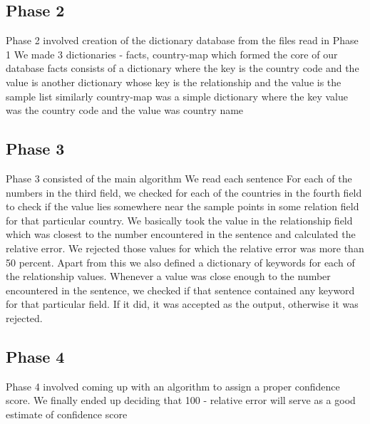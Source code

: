\documentclass{pracjourn}
\begin{document}
\subsection{Phase 2}
Phase 2 involved creation of the dictionary database from the files read in Phase 1
We made 3 dictionaries - facts, country-map which formed the core of our database
facts consists of a dictionary where the key is the country code and the value is another dictionary whose key is the relationship and the value is the sample list
similarly country-map was a simple dictionary where the key value was the country code and the value was country name

\subsection{Phase 3}
Phase 3 consisted of the main algorithm
We read each sentence
For each of the numbers in the third field, we checked for each of the countries in the fourth field to check if the value lies somewhere near the sample points in some relation field for that particular country.
We basically took the value in the relationship field which was closest to the number encountered in the sentence and calculated the relative error.
We rejected those values for which the relative error was more than 50 percent.
Apart from this we also defined a dictionary of keywords for each of the relationship values.
Whenever a value was close enough to the number encountered in the sentence, we checked if that sentence contained any keyword for that particular field.
If it did, it was accepted as the output, otherwise it was rejected.

\subsection{Phase 4}
Phase 4 involved coming up with an algorithm to assign a proper confidence score.
We finally ended up deciding that 100 - relative error will serve as a good estimate of confidence score
\end{document}
